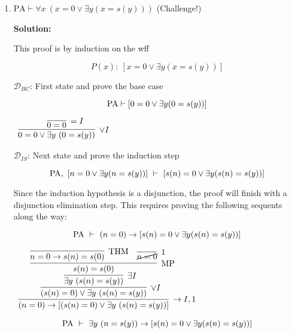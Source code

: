 \documentclass[11pt]{report}
\begin{document}
\begin{enumerate}
\begin{enumerate}
		\newpage
		\item $\text{PA} \vdash \forall x \ (x = 0 \lor \exists y (x = s(y)))$ \hfill (Challenge!)

		{\bf Solution:} 

		This proof is by induction on the wff 

		$$ P(x) : \ [x = 0 \lor \exists y (x = s(y))]$$

		$\mathcal{D}_{BC}$: First state and prove the base case 

		$$ \text{PA} \vdash [0 = 0 \lor \exists y (0 = s(y))]$$

		\begin{mdframed}
			\begin{center}
				$\begin{array}{c}
					\infer[\lor I]{0=0 \lor \exists y \ (0 = s(y))}
						{\infer[=I]{0=0}	
							{}}
				\end{array}$
			\end{center}
		\end{mdframed}

		
		$\mathcal{D}_{IS}$: Next state and prove the induction step

		$$ \text{PA}, \ [n = 0 \lor \exists y (n = s(y))] \ \vdash \ [s(n) = 0 \lor \exists y (s(n) = s(y))]$$

		Since the induction hypothesis is a disjunction, the proof will finish with a disjunction elimination step. This requires proving the following sequents along the way: 

		$$ \text{PA} \ \vdash \ (n=0) \to [s(n) = 0 \lor \exists y (s(n) = s(y))]$$

		\begin{mdframed}
			\begin{center}
				$\begin{array}{c}
					\infer[\to I,1]{(n=0) \to [(s(n)=0) \lor \exists y \ (s(n)=s(y))]}
								{\infer[\lor I]{(s(n)=0) \lor \exists y \ (s(n)=s(y))}
									{\infer[\exists I]{\exists y \ (s(n)=s(y))}
										{\infer[\MP]{s(n)=s(0)}
											{\infer[\THM]{n=0 \to s(n)=s(0)}{}
											&
											\infer[1]{\cancel{n=0}}{}}}}}
				\end{array}$
			\end{center}
		\end{mdframed}

$$ \text{PA} \ \vdash \ \exists y \ (n=s(y)) \to [s(n) = 0 \lor \exists y (s(n) = s(y))]$$


\end{enumerate}
\end{enumerate}
\end{document}
